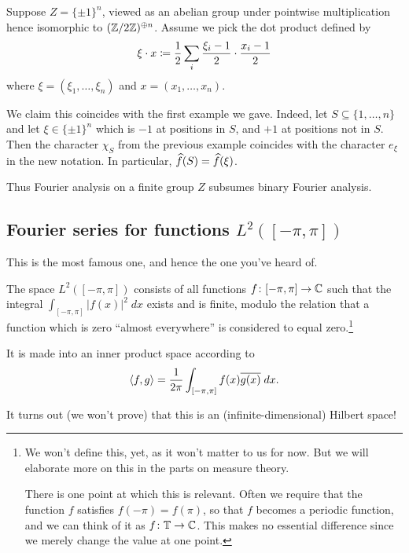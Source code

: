 \begin{example}
	Suppose $Z = \{\pm 1\}^n$, viewed as an abelian group
	under pointwise multiplication
	hence isomorphic to $(\mathbb Z/2\mathbb Z)^{\oplus n}$.
	Assume we pick the dot product defined by
	\[  \xi \cdot x \coloneqq \frac{1}{2} \sum_i \frac{\xi_i-1}{2} \cdot \frac{x_i-1}{2} \]
	where $\xi = (\xi_1, \dots, \xi_n)$ and $x = (x_1, \dots, x_n)$.

	We claim this coincides with the first example we gave.
	Indeed, let $S \subseteq \{1, \dots, n\}$
	and let $\xi \in \{\pm1\}^n$ which is $-1$ at positions in $S$,
	and $+1$ at positions not in $S$.
	Then the character $\chi_S$ from the previous example
	coincides with the character $e_\xi$ in the new notation.
	In particular, $\widehat f(S) = \widehat f(\xi)$.

	Thus Fourier analysis on a finite group $Z$ subsumes
	binary Fourier analysis.
\end{example}

\subsection{Fourier series for functions $L^2([-\pi, \pi])$}
This is the most famous one, and hence the one you've heard of.
\begin{definition}
	The space $L^2([-\pi, \pi])$ consists of all functions
	$f \colon [-\pi, \pi] \to \mathbb C$ such that
	the integral
	$\int_{[-\pi, \pi]} \left\lvert f(x) \right\rvert^2 \; dx$
	exists and is finite,
	modulo the relation that a function which is zero ``almost everywhere''
	is considered to equal zero.\footnote{We won't define this, yet,
		as it won't matter to us for now.
		But we will elaborate more on this in the parts on measure theory.

		There is one point at which this is relevant.
		Often we require that the function $f$ satisfies $f(-\pi) = f(\pi)$,
		so that $f$ becomes a periodic function,
		and we can think of it as $f \colon \mathbb T \to \mathbb C$.
		This makes no essential difference
		since we merely change the value at one point.}

	It is made into an inner product space according to
	\[ \left< f,g \right>
		= \frac{1}{2\pi} \int_{[-\pi, \pi]} f(x) \overline{g(x)} \; dx. \]
\end{definition}
It turns out (we won't prove) that this is an
(infinite-dimensional) Hilbert space!

